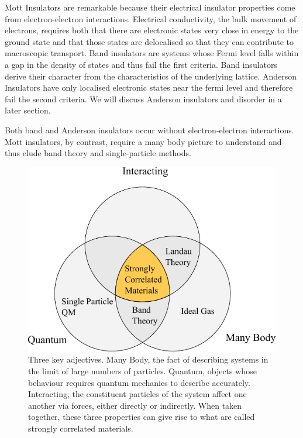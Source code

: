 Mott Insulators are remarkable because their electrical insulator properties come from electron-electron interactions. Electrical conductivity, the bulk movement of electrons, requires both that there are electronic states very close in energy to the ground state and that those states are delocalised so that they can contribute to macroscopic transport. Band insulators are systems whose Fermi level falls within a gap in the density of states and thus fail the first criteria. Band insulators derive their character from the characteristics of the underlying lattice. Anderson Insulators have only localised electronic states near the fermi level and therefore fail the second criteria. We will discuss Anderson insulators and disorder in a later section.

Both band and Anderson insulators occur without electron-electron interactions. Mott insulators, by contrast, require a many body picture to understand and thus elude band theory and single-particle methods.

\hypertarget{fig:venn_diagram}{%
\begin{figure}
\centering
\includegraphics[width=1\textwidth,height=\textheight]{figure_code/intro_chapter/venn_diagram}
\caption[{Interacting Quantum Many Body Systems Venn Diagram}]{Three key adjectives. Many Body, the fact of describing systems in the limit of large numbers of particles. Quantum, objects whose behaviour requires quantum mechanics to describe accurately. Interacting, the constituent particles of the system affect one another via forces, either directly or indirectly. When taken together, these three properties can give rise to what are called strongly correlated materials.}
\label{fig:venn_diagram}
\end{figure}
}

